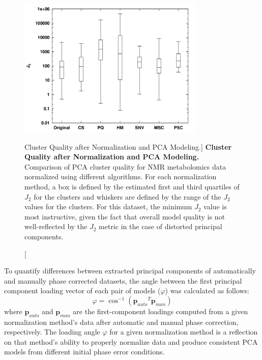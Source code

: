 \begin{figure}
\includegraphics[width=3.5in]{figs/pscorr/02-allj2.png}
\caption
      [Cluster Quality after Normalization and PCA Modeling.]{
  {\bf Cluster Quality after Normalization and PCA Modeling.}
  \\
  Comparison of PCA cluster quality for \hnmr{} NMR metabolomics data
  normalized using different algorithms. For each normalization method, a
  box is defined by the estimated first and third quartiles of $J_2$ for the
  clusters and whiskers are defined by the range of the $J_2$ values for the
  clusters. For this dataset, the minimum $J_2$ value is most instructive,
  given the fact that overall model quality is not well-reflected by the
  $J_2$ metric in the case of distorted principal components.
}
\end{figure}

\begin{doublespace}
To quantify differences between extracted principal components of automatically
and manually phase corrected datasets, the angle between the first principal
component loading vector of each pair of models ($\varphi$) was calculated as
follows:
\begin{equation}
\varphi = \cos^{-1}\left( {\mathbf{p}_{auto}}^T \mathbf{p}_{man} \right)
\end{equation}
where $\mathbf{p}_{auto}$ and $\mathbf{p}_{man}$ are the first-component
loadings computed from a given normalization method's data after automatic
and manual phase correction, respectively. The loading angle $\varphi$ for a
given normalization method is a reflection on that method's ability to properly
normalize data and produce consistent PCA models from different initial phase
error conditions.
\end{doublespace}

